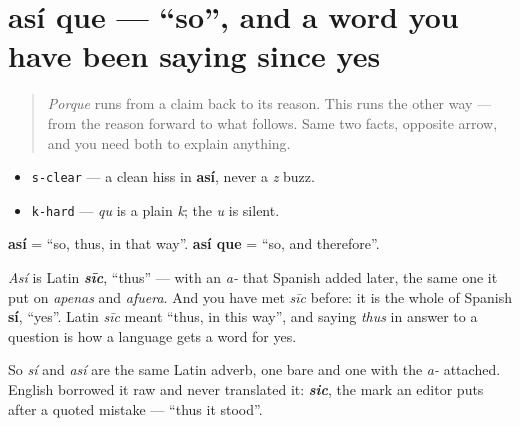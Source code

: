 \section[así]{así que — \textquotedblleft{}so\textquotedblright{}, and a word you have been saying since yes}

\label{lesson:ES-C39-asi-que}



\begin{quote}
\emph{Porque} runs from a claim back to its reason. This runs the other way — from the reason forward to what follows. Same two facts, opposite arrow, and you need both to explain anything.
\end{quote}

\begin{sounds}
\begin{itemize}
\raggedright
  \item \texttt{s-clear} — a clean hiss in \textbf{así}, never a \emph{z} buzz.
  \item \texttt{k-hard} — \emph{qu} is a plain \emph{k}; the \emph{u} is silent.
\end{itemize}
\end{sounds}

\begin{cousinweb}
\textbf{así} = \textquotedblleft{}so, thus, in that way\textquotedblright{}. \textbf{así que} = \textquotedblleft{}so, and therefore\textquotedblright{}.

\emph{Así} is Latin \emph{\textbf{sīc}}, \textquotedblleft{}thus\textquotedblright{} — with an \emph{a-} that Spanish added later, the same one it put on \emph{apenas} and \emph{afuera}. And you have met \emph{sīc} before: it is the whole of Spanish \textbf{sí}, \textquotedblleft{}yes\textquotedblright{}. Latin \emph{sīc} meant \textquotedblleft{}thus, in this way\textquotedblright{}, and saying \emph{thus} in answer to a question is how a language gets a word for yes.

So \emph{sí} and \emph{así} are the same Latin adverb, one bare and one with the \emph{a-} attached. English borrowed it raw and never translated it: \emph{\textbf{sic}}, the mark an editor puts after a quoted mistake — \textquotedblleft{}thus it stood\textquotedblright{}.
\end{cousinweb}

